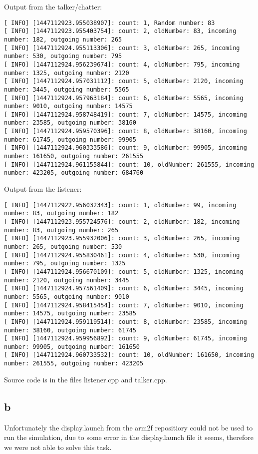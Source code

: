 Output from the talker/chatter:
\begin{lstlisting}
[ INFO] [1447112923.955038907]: count: 1, Random number: 83
[ INFO] [1447112923.955403754]: count: 2, oldNumber: 83, incoming number: 182, outgoing number: 265
[ INFO] [1447112924.955113306]: count: 3, oldNumber: 265, incoming number: 530, outgoing number: 795
[ INFO] [1447112924.956239674]: count: 4, oldNumber: 795, incoming number: 1325, outgoing number: 2120
[ INFO] [1447112924.957031112]: count: 5, oldNumber: 2120, incoming number: 3445, outgoing number: 5565
[ INFO] [1447112924.957963184]: count: 6, oldNumber: 5565, incoming number: 9010, outgoing number: 14575
[ INFO] [1447112924.958748419]: count: 7, oldNumber: 14575, incoming number: 23585, outgoing number: 38160
[ INFO] [1447112924.959570396]: count: 8, oldNumber: 38160, incoming number: 61745, outgoing number: 99905
[ INFO] [1447112924.960333586]: count: 9, oldNumber: 99905, incoming number: 161650, outgoing number: 261555
[ INFO] [1447112924.961155844]: count: 10, oldNumber: 261555, incoming number: 423205, outgoing number: 684760
\end{lstlisting}

Output from the listener:
\begin{lstlisting}
[ INFO] [1447112922.956032343]: count: 1, oldNumber: 99, incoming number: 83, outgoing number: 182
[ INFO] [1447112923.955724576]: count: 2, oldNumber: 182, incoming number: 83, outgoing number: 265
[ INFO] [1447112923.955932006]: count: 3, oldNumber: 265, incoming number: 265, outgoing number: 530
[ INFO] [1447112924.955830461]: count: 4, oldNumber: 530, incoming number: 795, outgoing number: 1325
[ INFO] [1447112924.956670109]: count: 5, oldNumber: 1325, incoming number: 2120, outgoing number: 3445
[ INFO] [1447112924.957561409]: count: 6, oldNumber: 3445, incoming number: 5565, outgoing number: 9010
[ INFO] [1447112924.958415454]: count: 7, oldNumber: 9010, incoming number: 14575, outgoing number: 23585
[ INFO] [1447112924.959119514]: count: 8, oldNumber: 23585, incoming number: 38160, outgoing number: 61745
[ INFO] [1447112924.959956892]: count: 9, oldNumber: 61745, incoming number: 99905, outgoing number: 161650
[ INFO] [1447112924.960733532]: count: 10, oldNumber: 161650, incoming number: 261555, outgoing number: 423205
\end{lstlisting}

Source code is in the files listener.cpp and talker.cpp.

\subsection{b}\label{ass3_t2_b}

Unfortunately the display.launch from the arm2f repositiory could not be used to run the simulation, due to some error in the display.launch file it seems, therefore we were not able to solve this task.